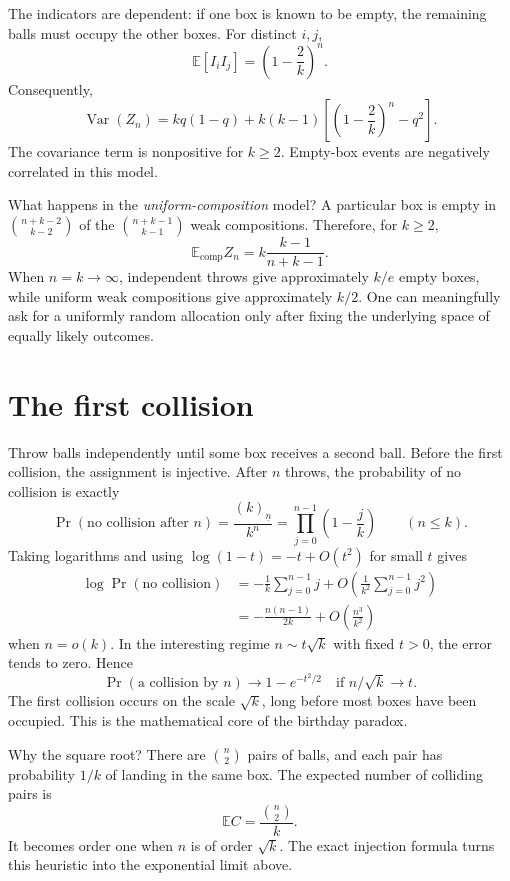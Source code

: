 The indicators are dependent: if one box is known to be empty, the remaining balls must occupy the other boxes. For distinct \(i,j\),
\[
 \mathbb E[I_iI_j]=\left(1-\frac2k\right)^n.
\]
Consequently,
\[
 \boxed{
 \operatorname{Var}(Z_n)=kq(1-q)+
 k(k-1)\left[\left(1-\frac2k\right)^n-q^2\right].
 }
\]
The covariance term is nonpositive for \(k\ge2\). Empty-box events are negatively correlated in this model.

What happens in the \emph{uniform-composition} model? A particular box is empty in
\(\binom{n+k-2}{k-2}\) of the \(\binom{n+k-1}{k-1}\) weak compositions. Therefore, for \(k\ge2\),
\[
 \boxed{\mathbb E_{\mathrm{comp}} Z_n
 =k\frac{k-1}{n+k-1}.}
\]
When \(n=k\to\infty\), independent throws give approximately \(k/e\) empty boxes, while uniform weak compositions give approximately \(k/2\). One can meaningfully ask for a uniformly random allocation only after fixing the underlying space of equally likely outcomes.

\section{The first collision}

Throw balls independently until some box receives a second ball. Before the first collision, the assignment is injective. After \(n\) throws, the probability of no collision is exactly
\[
 \Pr(\text{no collision after }n)
 =\frac{(k)_{\underline n}}{k^n}
 =\prod_{j=0}^{n-1}\left(1-\frac jk\right)
 \qquad(n\le k).
\]
Taking logarithms and using \(\log(1-t)=-t+O(t^2)\) for small \(t\) gives
\[
 \begin{aligned}
 \log\Pr(\text{no collision})
 &=-\frac1k\sum_{j=0}^{n-1}j
   +O\left(\frac1{k^2}\sum_{j=0}^{n-1}j^2\right)\\
 &=-\frac{n(n-1)}{2k}
   +O\left(\frac{n^3}{k^2}\right)
 \end{aligned}
\]
when \(n=o(k)\). In the interesting regime \(n\sim t\sqrt{k}\) with fixed \(t>0\), the error tends to zero. Hence
\[
 \boxed{
 \Pr(\text{a collision by }n)
 \longrightarrow1-e^{-t^2/2}
 \quad\text{if }n/\sqrt{k}\longrightarrow t.
 }
\]
The first collision occurs on the scale \(\sqrt{k}\), long before most boxes have been occupied. This is the mathematical core of the birthday paradox.

Why the square root? There are \(\binom n2\) pairs of balls, and each pair has probability \(1/k\) of landing in the same box. The expected number of colliding pairs is
\[
 \mathbb E C=\frac{\binom n2}{k}.
\]
It becomes order one when \(n\) is of order \(\sqrt{k}\). The exact injection formula turns this heuristic into the exponential limit above.

